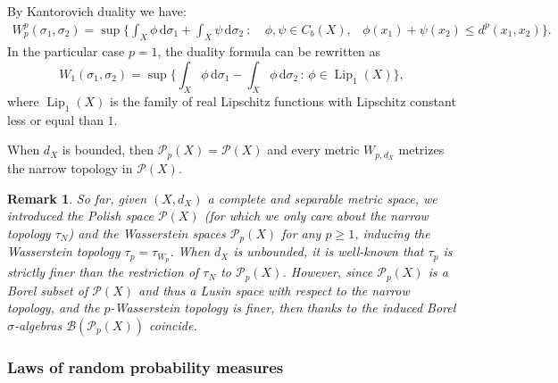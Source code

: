 \documentclass[10pt,leqno]{amsart}
\numberwithin{equation}{section}
\newtheorem{oss}[teorema]{Remark}
\newcommand{\PP}{\mathcal{P}}
\renewcommand{\d}{\mathrm{d}}
\begin{document}
By Kantorovich duality we 
have:
    \begin{equation}
    \begin{aligned}
        W_p^p(\sigma_1,\sigma_2) = \sup\bigg\{ 
        \int_X \phi \,\d\sigma_1 + \int_X \psi \,\d\sigma_2 \ : \ & \phi,\psi\in C_b(X),
        & \phi(x_1) + \psi(x_2) \leq d^{p}(x_1,x_2) \bigg\}.
    \end{aligned}
    \end{equation}
    In the particular case $p=1$, the duality formula can be rewritten as 
    \begin{equation}
        W_1(\sigma_1,\sigma_2) = \sup\bigg\{ 
        \int_X \phi \,\d\sigma_1 - \int_X \phi \,\d\sigma_2 \, : \, \phi\in\operatorname{Lip}_1(X) \bigg\},
    \end{equation}
where $\operatorname{Lip}_1(X)$ is the family of real Lipschitz functions 
with Lipschitz constant less or equal than $1$.

When $d_X$ is bounded,
then $\PP_p(X)=\PP(X)$ 
and every metric 
$W_{p,d_X}$ metrizes the narrow topology
in $\PP(X)$.
\nc 
\begin{oss}\label{equiv of Borel for polish}
    So far, given $(X,d_X) $ 
    a complete and separable metric space, we introduced the Polish space $\PP(X)$ 
    (for which we only care about the narrow topology $\tau_N$) and the Wasserstein spaces $\PP_p(X)$ for any $p\geq 1$, inducing the Wasserstein
    topology $\tau_p = \tau_{W_p}$. 
    When $d_X$ is unbounded,
    it is well-known that $\tau_p$ is strictly 
    finer than the restriction of 
     $\tau_N$ to $\PP_p(X)$. 
     However, since 
     $\PP_p(X)$ is a Borel subset of $\PP(X)$
     and thus a Lusin space
     with respect to the narrow topology,
     and the $p$-Wasserstein topology is finer, 
     then thanks to \cite[Corollary 2, pp. 101]{schwariz1973radon} 
     the induced Borel $\sigma$-algebras $\mathcal{B}(\PP_p(X))$ coincide. 
\end{oss}
%
%
\subsubsection{Laws of random probability measures}\label{subsec: topology over random measures}
\end{document}
